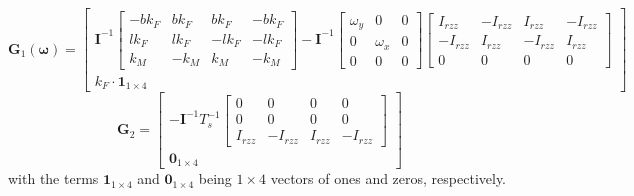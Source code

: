 \documentclass[11pt, a4paper, twoside]{report}
\begin{document}
\begin{equation}
	\bm{G}_1 (\bm{\omega}) =
	\begin{bmatrix}
		\bm{I}^{-1}\begin{bmatrix}
			-bk_F & bk_F & bk_F & -bk_F \\
			lk_F & lk_F & -lk_F & -lk_F \\
			k_M & -k_M & k_M & -k_M 
		\end{bmatrix} - 	
		\bm{I}^{-1}\begin{bmatrix}
			\omega_y & 0 & 0 \\
			0 & \omega_x & 0 \\
			0 & 0 & 0 
		\end{bmatrix}	
		\begin{bmatrix}
			I_{rzz} & -I_{rzz} & I_{rzz} & -I_{rzz} \\
			-I_{rzz} & I_{rzz} & -I_{rzz} & I_{rzz} \\
			0 & 0 & 0 & 0 
		\end{bmatrix}\\
			k_F \cdot \bm{1}_{1\times4}
	\end{bmatrix}
	\label{eq:G1}
\end{equation}
\begin{equation}
	\bm{G}_2 = 
	\begin{bmatrix}
		-\bm{I}^{-1} T_s^{-1}\begin{bmatrix}
			0 & 0 & 0 & 0 \\
			0 & 0 & 0 & 0 \\
			I_{rzz} & -I_{rzz} & I_{rzz} & -I_{rzz}
		\end{bmatrix} \\
		\bm{0}_{1\times4}
	\end{bmatrix}
	\label{eq:G2}
\end{equation}
with the terms $\bm{1}_{1\times4}$ and $\bm{0}_{1\times4}$ being $1\times4$ vectors of ones and zeros, respectively.
\end{document}
